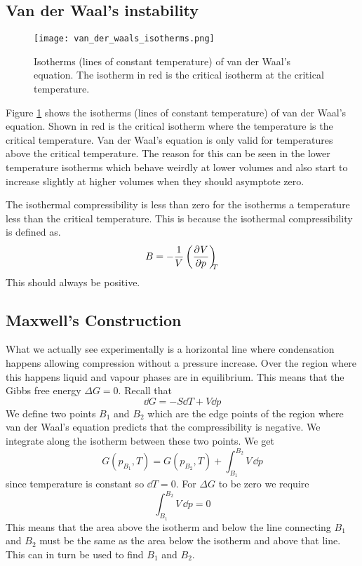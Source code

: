 \documentclass{article}
\begin{document}
    \subsection{Van der Waal's instability}
    \begin{figure}[ht]
        \centering
        \texttt{[image: van\_der\_waals\_isotherms.png]}
        \caption{Isotherms (lines of constant temperature) of van der Waal's equation.
            The isotherm in red is the critical isotherm at the critical temperature.}
        \label{fig:isotherms of van der Waal}
    \end{figure}
    Figure \ref{fig:isotherms of van der Waal} shows the isotherms (lines of constant temperature) of van der Waal's equation.
    Shown in red is the critical isotherm where the temperature is the critical temperature.
    Van der Waal's equation is only valid for temperatures above the critical temperature.
    The reason for this can be seen in the lower temperature isotherms which behave weirdly at lower volumes and also start to increase slightly at higher volumes when they should asymptote zero.
    
    The isothermal compressibility is less than zero for the isotherms a temperature less than the critical temperature.
    This is because the isothermal compressibility is defined as.
    \[B = -\frac{1}{V}\left(\pdv[]{V}{p}\right)_{\!\!\!{T}}\]
    This should always be positive.
    
    \subsection{Maxwell's Construction}
    What we actually see experimentally is a horizontal line where condensation happens allowing compression without a pressure increase.
    Over the region where this happens liquid and vapour phases are in equilibrium.
    This means that the Gibbs free energy \(\Delta G = 0\).
    Recall that
    \[\dd G = -S\dd T + V\dd p\]
    We define two points \(B_1\) and \(B_2\) which are the edge points of the region where van der Waal's equation predicts that the compressibility is negative.
    We integrate along the isotherm between these two points.
    We get
    \[G(p_{B_1}, T) = G(p_{B_2}, T) + \int_{B_1}^{B_2}V\,\dd p\]
    since temperature is constant so \(\dd T = 0\).
    For \(\Delta G\) to be zero we require
    \[\int_{B_1}^{B_2}V\,\dd p = 0\]
    This means that the area above the isotherm and below the line connecting \(B_1\) and \(B_2\) must be the same as the area below the isotherm and above that line.
    This can in turn be used to find \(B_1\) and \(B_2\).
    
\end{document}
